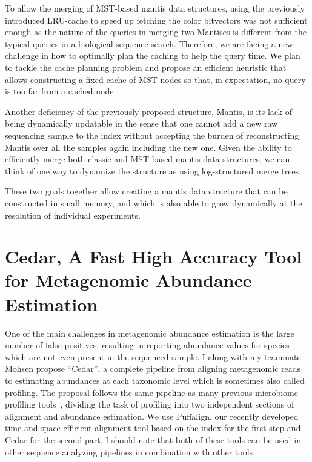To allow the merging of MST-based mantis data structures,
using the previously introduced LRU-cache to speed up fetching the color bitvectors
was not sufficient enough as the nature of the queries in merging two Mantises
is different from the typical queries in a biological sequence search.
Therefore, we are facing a new challenge in how to optimally plan the caching
to help the query time. We plan to tackle the cache planning problem and
propose an efficient heuristic that allows constructing a fixed cache of MST nodes
so that, in expectation, no query is too far from a cached node.

Another deficiency of the previously proposed structure, Mantis,
is its lack of being dynamically updatable in the sense that one cannot
add a new raw sequencing sample to the index without accepting the burden of
reconstructing Mantis over all the samples again including the new one.
Given the ability to efficiently merge both classic and MST-based mantis data structures,
we can think of one way to dynamize the structure as using log-structured merge trees.

These two goals together allow creating a mantis data structure that can be constructed in small memory,
and which is also able to grow dynamically at the resolution of individual experiments.


\section{Cedar, A Fast High Accuracy Tool for Metagenomic Abundance Estimation}
One of the main challenges in metagenomic abundance estimation is the large number of
false positives, resulting in reporting abundance values for species
which are not even present in the sequenced sample.
I along with my teammate Mohsen propose ``Cedar'',
a complete pipeline from aligning metagenomic reads to estimating abundances at each taxonomic level
which is sometimes also called profiling.
The proposal follows the same pipeline as many previous microbiome profiling tools~\cite{},
dividing the task of profiling into two independent sections of alignment and abundance estimation.
We use Puffalign, our recently developed time and space efficient alignment tool
based on the \pufferfish index for the first step and Cedar for the second part.
I should note that both of these tools can be used in other sequence analyzing pipelines
in combination with other tools.

